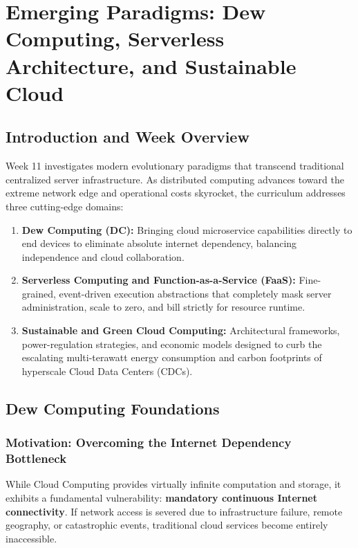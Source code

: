 \documentclass[11pt,a4paper,openany]{report}
\begin{document}
\chapter{Emerging Paradigms: Dew Computing, Serverless Architecture, and Sustainable Cloud}

\section{Introduction and Week Overview}
Week 11 investigates modern evolutionary paradigms that transcend traditional centralized server infrastructure. As distributed computing advances toward the extreme network edge and operational costs skyrocket, the curriculum addresses three cutting-edge domains:
\begin{enumerate}[leftmargin=*]
  \item \textbf{Dew Computing (DC):} Bringing cloud microservice capabilities directly to end devices to eliminate absolute internet dependency, balancing independence and cloud collaboration.
  \item \textbf{Serverless Computing and Function-as-a-Service (FaaS):} Fine-grained, event-driven execution abstractions that completely mask server administration, scale to zero, and bill strictly for resource runtime.
  \item \textbf{Sustainable and Green Cloud Computing:} Architectural frameworks, power-regulation strategies, and economic models designed to curb the escalating multi-terawatt energy consumption and carbon footprints of hyperscale Cloud Data Centers (CDCs).
\end{enumerate}

\section{Dew Computing Foundations}
\subsection{Motivation: Overcoming the Internet Dependency Bottleneck}
While Cloud Computing provides virtually infinite computation and storage, it exhibits a fundamental vulnerability: \textbf{mandatory continuous Internet connectivity}. If network access is severed due to infrastructure failure, remote geography, or catastrophic events, traditional cloud services become entirely inaccessible.
\end{document}
